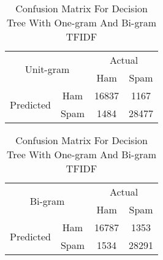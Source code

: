 \begin{table}
\centering
\begin{subtable}{.5\textwidth}
\centering
\begin{tabular}{@{}|c|c|c|c|@{}}
\toprule
\multicolumn{2}{|c|}{\multirow{2}{*}{Unit-gram}} & \multicolumn{2}{c|}{Actual} \\ \cmidrule(l){3-4} 
\multicolumn{2}{|c|}{}                        & Ham          & Spam         \\ \midrule
\multirow{2}{*}{Predicted}       & Ham        & 16837        & 1167         \\ \cmidrule(l){2-4} 
                                 & Spam       & 1484         & 28477        \\ \bottomrule
\end{tabular}

\begin{tabular}{@{}|c|c|c|c|@{}}
\toprule
\multicolumn{2}{|c|}{\multirow{2}{*}{Bi-gram}} & \multicolumn{2}{c|}{Actual} \\ \cmidrule(l){3-4} 
\multicolumn{2}{|c|}{}                        & Ham          & Spam         \\ \midrule
\multirow{2}{*}{Predicted}       & Ham        & 16787        & 1353         \\ \cmidrule(l){2-4} 
                                 & Spam       & 1534         & 28291        \\ \bottomrule
\end{tabular}
\end{subtable}
\caption{Confusion Matrix For Decision Tree With One-gram And Bi-gram TFIDF}
\label{Confusion_DT}
\end{table}
